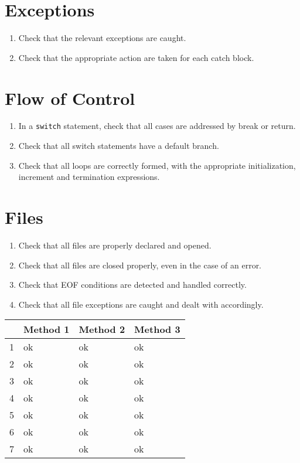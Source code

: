 \section*{Exceptions}\begin{enumerate}[resume]
\item Check that the relevant exceptions are caught.
\item Check that the appropriate action are taken for each catch block.
\end{enumerate}

\section*{Flow of Control}\begin{enumerate}[resume]
\item In a \texttt{switch} statement, check that all cases are addressed by break or return.
\item Check that all switch statements have a default branch.
\item Check that all loops are correctly formed, with the appropriate initialization, increment and termination expressions.
\end{enumerate}

\section*{Files}\begin{enumerate}[resume]
\item Check that all files are properly declared and opened.
\item Check that all files are closed properly, even in the case of an error.
\item Check that EOF conditions are detected and handled correctly.
\item Check that all file exceptions are caught and dealt with accordingly.
\end{enumerate}

\newpage
\begin{tabular}{l|l|l|l}
\hline 
 & Method 1 & Method 2 & Method 3\\
\hline
1 & ok & ok & ok\\
\hline 
2 & ok & ok & ok\\
\hline
3 & ok & ok & ok\\
\hline
4 & ok & ok & ok\\
\hline
5 & ok & ok & ok\\
\hline
6 & ok & ok & ok\\
\hline
7 & ok & ok & ok\\
\end{tabular}